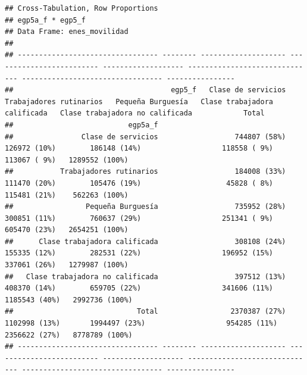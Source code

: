 \documentclass[
]{book}
\newenvironment{Shaded}{\begin{snugshade}}{\end{snugshade}}
\newcommand{\AttributeTok}[1]{\textcolor[rgb]{0.77,0.63,0.00}{#1}}
\newcommand{\DecValTok}[1]{\textcolor[rgb]{0.00,0.00,0.81}{#1}}
\newcommand{\FunctionTok}[1]{\textcolor[rgb]{0.00,0.00,0.00}{#1}}
\newcommand{\NormalTok}[1]{#1}
\newcommand{\SpecialCharTok}[1]{\textcolor[rgb]{0.00,0.00,0.00}{#1}}
\newcommand{\StringTok}[1]{\textcolor[rgb]{0.31,0.60,0.02}{#1}}
\begin{document}
\begin{Shaded}
\end{Shaded}

\begin{verbatim}
## Cross-Tabulation, Row Proportions  
## egp5a_f * egp5_f  
## Data Frame: enes_movilidad  
## 
## --------------------------------- -------- -------------------- ------------------------- ------------------- ------------------------------ --------------------------------- ----------------
##                                     egp5_f   Clase de servicios   Trabajadores rutinarios   Pequeña Burguesía   Clase trabajadora calificada   Clase trabajadora no calificada            Total
##                           egp5a_f                                                                                                                                                              
##                Clase de servicios                  744807 (58%)              126972 (10%)        186148 (14%)                   118558 ( 9%)                      113067 ( 9%)   1289552 (100%)
##           Trabajadores rutinarios                  184008 (33%)              111470 (20%)        105476 (19%)                    45828 ( 8%)                      115481 (21%)    562263 (100%)
##                 Pequeña Burguesía                  735952 (28%)              300851 (11%)        760637 (29%)                   251341 ( 9%)                      605470 (23%)   2654251 (100%)
##      Clase trabajadora calificada                  308108 (24%)              155335 (12%)        282531 (22%)                   196952 (15%)                      337061 (26%)   1279987 (100%)
##   Clase trabajadora no calificada                  397512 (13%)              408370 (14%)        659705 (22%)                   341606 (11%)                     1185543 (40%)   2992736 (100%)
##                             Total                 2370387 (27%)             1102998 (13%)       1994497 (23%)                   954285 (11%)                     2356622 (27%)   8778789 (100%)
## --------------------------------- -------- -------------------- ------------------------- ------------------- ------------------------------ --------------------------------- ----------------
\end{verbatim}
\end{document}
